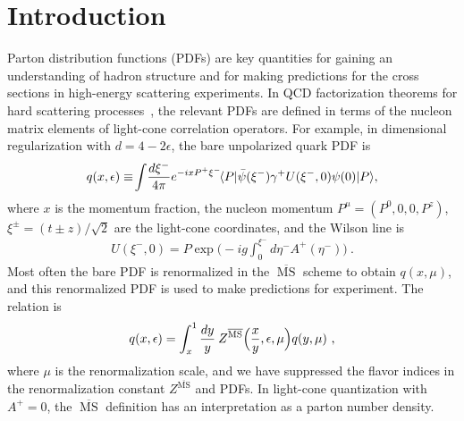 \documentclass[prd,aps,twocolumn,preprintnumbers,showpacs,nofootinbib,superscriptaddress,notitlepage]{revtex4-1}
\newcommand{\beq}{\begin{eqnarray}}
\newcommand{\eeq}{\end{eqnarray}}
\begin{document}
\maketitle

\section{Introduction}

Parton distribution functions (PDFs) are key quantities for gaining an understanding of hadron structure and for making predictions for the cross sections in high-energy scattering experiments. In QCD factorization theorems for hard scattering processes~\cite{Collins:1989gx}, the relevant PDFs are defined in terms of the nucleon matrix elements of light-cone correlation operators. For example, in dimensional regularization with $d=4-2\epsilon$, the bare unpolarized quark PDF is
\begin{align} \label{eq:lcpdf}
	q(x,\epsilon) \equiv\! \int\! {d\xi^-\over 4\pi} e^{-ixP^+\xi^-}\! \langle P | \bar{\psi}  (\xi^-) \gamma^+ U (\xi^-, 0) \psi (0) | P \rangle ,
\end{align}
where $x$ is the momentum fraction, the nucleon momentum $P^\mu=(P^0,0,0,P^z)$, $\xi^{\pm}=(t\pm z)/\sqrt{2}$ are the light-cone coordinates, and the Wilson line is
\begin{align}
	U(\xi^-,0) = P\exp\biggl(-ig\int_0^{\xi^-} d\eta^- A^+(\eta^-)\biggr)\ .
\end{align}
Most often the bare PDF is renormalized in the $\overline{\ensuremath{\operatorname{MS}}}$ scheme to obtain $q(x,\mu)$, and this renormalized PDF  is used to make predictions for experiment. The relation is
\beq
	q(x,\epsilon) = \int_x^1 {dy\over y}\:  Z^{\overline{\ensuremath{\operatorname{MS}}}}\Bigl({x\over y},\epsilon,\mu\Bigr) q(y,\mu)\ ,
\eeq
where $\mu$ is the renormalization scale, and we have suppressed the flavor indices in the renormalization constant $Z^{\overline{\ensuremath{\operatorname{MS}}}}$ and PDFs. In light-cone quantization with $A^+=0$, the $\overline{\ensuremath{\operatorname{MS}}}$ definition has an interpretation as a parton number density.
\end{document}

